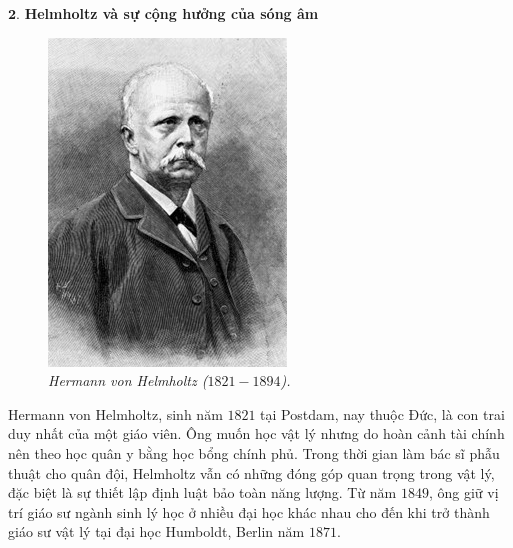 \begin{multicols}{2}
	\vskip 0.1cm
	$\pmb{2.}$ \textbf{\color{timhieukhoahoc}Helmholtz và sự cộng hưởng của sóng âm}
	\begin{figure}[H]
		\centering
		\vspace*{-5pt}
		\captionsetup{labelformat= empty, justification=centering}
		\includegraphics[width=1\linewidth]{1}
		\caption{\small\textit{\color{timhieukhoahoc}Hermann von Helmholtz ($1821 - 1894$).}}
		\vspace*{-10pt}
	\end{figure}
	Hermann von Helmholtz, sinh năm $1821$ tại Postdam, nay thuộc Đức, là con trai duy nhất của một giáo viên. Ông muốn học vật lý nhưng do hoàn cảnh tài chính nên theo học quân y bằng học bổng chính phủ. Trong thời gian làm bác sĩ phẫu thuật cho quân đội, Helmholtz vẫn có những đóng góp quan trọng trong vật lý, đặc biệt là sự thiết lập định luật bảo toàn năng lượng. Từ năm $1849$, ông giữ vị trí giáo sư ngành sinh lý học ở nhiều đại học khác nhau cho đến khi trở thành giáo sư vật lý tại đại học Humboldt, Berlin năm $1871$.

\end{multicols}
